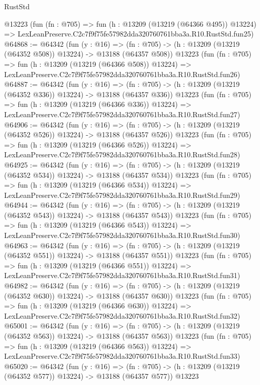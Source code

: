 \begin{lexlean}{RustStd}
\begin{coremodule}
    @13223
    (fun (fn : @705) =>
    fun (h : @13209 (@13219 (@64366 @495)) @13224) =>
    LexLeanPreserve.C2c7f9f75fe57982dda320760761bba3a.R10.RustStd.fun25)
@64868 := @64342
    (fun (y : @16) =>
    (fn : @705) -> (h : @13209 (@13219 (@64352 @508)) @13224) -> @13188 (@64357 @508))
    @13223
    (fun (fn : @705) =>
    fun (h : @13209 (@13219 (@64366 @508)) @13224) =>
    LexLeanPreserve.C2c7f9f75fe57982dda320760761bba3a.R10.RustStd.fun26)
@64887 := @64342
    (fun (y : @16) =>
    (fn : @705) -> (h : @13209 (@13219 (@64352 @336)) @13224) -> @13188 (@64357 @336))
    @13223
    (fun (fn : @705) =>
    fun (h : @13209 (@13219 (@64366 @336)) @13224) =>
    LexLeanPreserve.C2c7f9f75fe57982dda320760761bba3a.R10.RustStd.fun27)
@64906 := @64342
    (fun (y : @16) =>
    (fn : @705) -> (h : @13209 (@13219 (@64352 @526)) @13224) -> @13188 (@64357 @526))
    @13223
    (fun (fn : @705) =>
    fun (h : @13209 (@13219 (@64366 @526)) @13224) =>
    LexLeanPreserve.C2c7f9f75fe57982dda320760761bba3a.R10.RustStd.fun28)
@64925 := @64342
    (fun (y : @16) =>
    (fn : @705) -> (h : @13209 (@13219 (@64352 @534)) @13224) -> @13188 (@64357 @534))
    @13223
    (fun (fn : @705) =>
    fun (h : @13209 (@13219 (@64366 @534)) @13224) =>
    LexLeanPreserve.C2c7f9f75fe57982dda320760761bba3a.R10.RustStd.fun29)
@64944 := @64342
    (fun (y : @16) =>
    (fn : @705) -> (h : @13209 (@13219 (@64352 @543)) @13224) -> @13188 (@64357 @543))
    @13223
    (fun (fn : @705) =>
    fun (h : @13209 (@13219 (@64366 @543)) @13224) =>
    LexLeanPreserve.C2c7f9f75fe57982dda320760761bba3a.R10.RustStd.fun30)
@64963 := @64342
    (fun (y : @16) =>
    (fn : @705) -> (h : @13209 (@13219 (@64352 @551)) @13224) -> @13188 (@64357 @551))
    @13223
    (fun (fn : @705) =>
    fun (h : @13209 (@13219 (@64366 @551)) @13224) =>
    LexLeanPreserve.C2c7f9f75fe57982dda320760761bba3a.R10.RustStd.fun31)
@64982 := @64342
    (fun (y : @16) =>
    (fn : @705) -> (h : @13209 (@13219 (@64352 @630)) @13224) -> @13188 (@64357 @630))
    @13223
    (fun (fn : @705) =>
    fun (h : @13209 (@13219 (@64366 @630)) @13224) =>
    LexLeanPreserve.C2c7f9f75fe57982dda320760761bba3a.R10.RustStd.fun32)
@65001 := @64342
    (fun (y : @16) =>
    (fn : @705) -> (h : @13209 (@13219 (@64352 @563)) @13224) -> @13188 (@64357 @563))
    @13223
    (fun (fn : @705) =>
    fun (h : @13209 (@13219 (@64366 @563)) @13224) =>
    LexLeanPreserve.C2c7f9f75fe57982dda320760761bba3a.R10.RustStd.fun33)
@65020 := @64342
    (fun (y : @16) =>
    (fn : @705) -> (h : @13209 (@13219 (@64352 @577)) @13224) -> @13188 (@64357 @577))
    @13223

\end{coremodule}
\end{lexlean}
